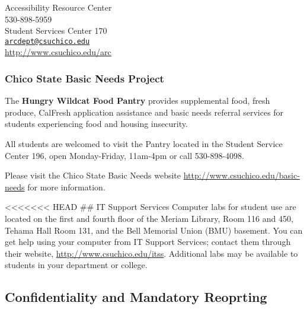 \documentclass[11pt,]{article}
\begin{document}
Accessibility Resource Center\\
530-898-5959\\
Student Services Center 170\\
\href{mailto:arcdept@csuchico.edu}{\nolinkurl{arcdept@csuchico.edu}}\\
\url{http://www.csuchico.edu/arc}

\hypertarget{chico-state-basic-needs-project}{%
\subsubsection{Chico State Basic Needs
Project}\label{chico-state-basic-needs-project}}

The \textbf{Hungry Wildcat Food Pantry} provides supplemental food,
fresh produce, CalFresh application assistance and basic needs referral
services for students experiencing food and housing insecurity.

All students are welcomed to visit the Pantry located in the Student
Service Center 196, open Monday-Friday, 11am-4pm or call 530-898-4098.

Please visit the Chico State Basic Needs website
\url{http://www.csuchico.edu/basic-needs} for more information.

\textless{}\textless{}\textless{}\textless{}\textless{}\textless{}\textless{}
HEAD \#\# IT Support Services Computer labs for student use are located
on the first and fourth floor of the Meriam Library, Room 116 and 450,
Tehama Hall Room 131, and the Bell Memorial Union (BMU) basement. You
can get help using your computer from IT Support Services; contact them
through their website, \url{http://www.csuchico.edu/itss}. Additional
labs may be available to students in your department or college.

\hypertarget{confidentiality-and-mandatory-reoprting}{%
\subsection{Confidentiality and Mandatory
Reoprting}\label{confidentiality-and-mandatory-reoprting}}
\end{document}
